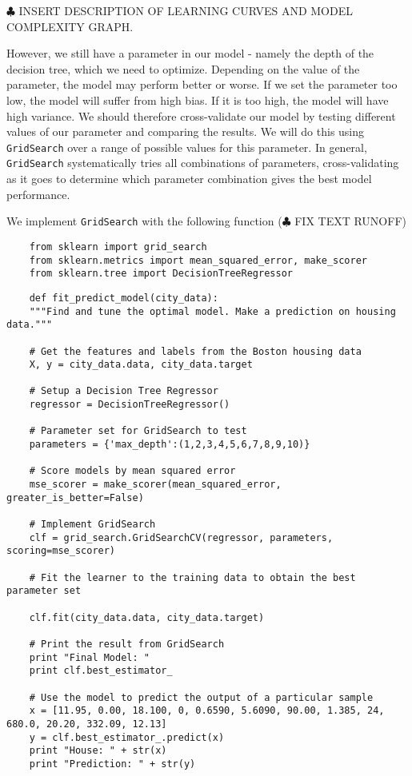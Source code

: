 \documentclass[12 pt]{article}
\numberwithin{equation}{section}
\begin{document}
$\clubsuit$ INSERT DESCRIPTION OF LEARNING CURVES AND MODEL COMPLEXITY GRAPH.

 However, we still have a parameter in our model - namely the depth of the decision tree, which we need to optimize. Depending on the value of the parameter, the model may perform better or worse. If we set the parameter too low, the model will suffer from high bias. If it is too high, the model will have high variance. We should therefore cross-validate our model by testing different values of our parameter and comparing the results. We will do this using \texttt{GridSearch} over a range of possible values for this parameter. In general, \texttt{GridSearch} systematically tries all combinations of parameters, cross-validating as it goes to determine which parameter combination gives the best model performance.

We implement \texttt{GridSearch} with the following function ($\clubsuit$ FIX TEXT RUNOFF)
\begin{verbatim}
	from sklearn import grid_search
	from sklearn.metrics import mean_squared_error, make_scorer
	from sklearn.tree import DecisionTreeRegressor
\end{verbatim}
\begin{verbatim}
	def fit_predict_model(city_data):
    """Find and tune the optimal model. Make a prediction on housing data."""

    # Get the features and labels from the Boston housing data
    X, y = city_data.data, city_data.target

    # Setup a Decision Tree Regressor
    regressor = DecisionTreeRegressor()
	
	# Parameter set for GridSearch to test 
    parameters = {'max_depth':(1,2,3,4,5,6,7,8,9,10)}
    
    # Score models by mean squared error
    mse_scorer = make_scorer(mean_squared_error, greater_is_better=False)
    
    # Implement GridSearch
    clf = grid_search.GridSearchCV(regressor, parameters, scoring=mse_scorer)
    
    # Fit the learner to the training data to obtain the best parameter set
   
    clf.fit(city_data.data, city_data.target)
    
    # Print the result from GridSearch
    print "Final Model: "
    print clf.best_estimator_
    
    # Use the model to predict the output of a particular sample
    x = [11.95, 0.00, 18.100, 0, 0.6590, 5.6090, 90.00, 1.385, 24, 680.0, 20.20, 332.09, 12.13]
    y = clf.best_estimator_.predict(x)
    print "House: " + str(x)
    print "Prediction: " + str(y)
\end{verbatim}
\end{document}
